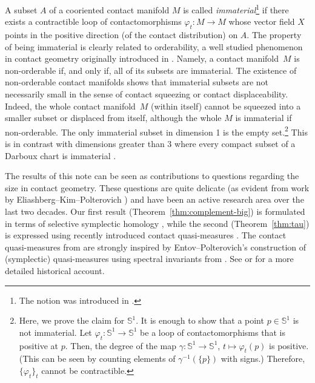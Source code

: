 \documentclass[pdftex]{sigma}
\numberwithin{equation}{section}
\theoremstyle{definition}
\begin{document}
A subset $A$ of a cooriented contact manifold $M$ is called \emph{immaterial}\footnote{The notion was introduced in \cite[Section~7]{uljarevic2023selective}.} if there exists a contractible loop of contactomorphisms $\varphi_t\colon M\to M$ whose vector field $X$ points in the positive direction (of the contact distribution) on $A$.
The property of being immaterial is clearly related to orderability, a well studied phenomenon in contact geometry originally introduced in \cite{eliashberg2000partially}. Namely, a contact manifold~$M$ is non-orderable if, and only if, all of its subsets are immaterial. The existence of non-orderable contact manifolds shows that immaterial subsets are not necessarily small in the sense of contact squeezing or contact displaceability. Indeed, the whole contact manifold~$M$ (within itself) cannot be squeezed into a smaller subset or displaced from itself, although the whole $M$ is immaterial if non-orderable.
The only immaterial subset in dimension 1 is the empty set.\footnote{{Here, we prove the claim for $\mathbb{S}^1$. It is enough to show that a point $p\in\mathbb{S}^1$ is not immaterial. Let $\varphi_t\colon \mathbb{S}^1\to \mathbb{S}^1$ be a loop of contactomorphisms that is positive at $p$. Then, the degree of the map $\gamma\colon\mathbb{S}^1\to \mathbb{S}^1$, $t\mapsto \varphi_t(p)$ is positive. (This can be seen by counting elements of $\gamma^{-1}(\{p\})$ with signs.) Therefore, $\{\varphi_t\}_t$ cannot be contractible.}} This is in contrast with dimensions greater than 3 where every compact subset of a Darboux chart is immaterial \cite[Lemma~7.3]{uljarevic2023selective}.

{The results of this note can be seen as contributions to questions regarding the size in contact geometry. These questions are quite delicate (as evident from work by Eliashberg--Kim--Polterovich \cite{eliashberg2006geometry}) and have been an active research area over the last two decades. Our first result (Theorem~\ref{thm:complement-big}) is formulated in terms of selective symplectic homology \cite{uljarevic2023selective}, while the second (Theorem~\ref{thm:tau}) is expressed using recently introduced contact quasi-measures \cite{djordjevic2025quantitative}. The contact quasi-measures from \cite{djordjevic2025quantitative} are strongly inspired by Entov--Polterovich's construction of (symplectic) quasi-measures \cite{EP06} using spectral invariants from \cite{oh2004construction}. See \cite{Ent14} or \cite{polterovich2014function} for a more detailed historical account.}
\end{document}
